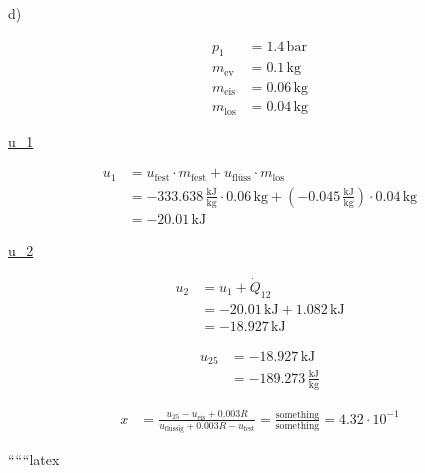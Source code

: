 d)

\begin{align*}
p_1 &= 1.4 \, \text{bar} \\
m_{\text{ev}} &= 0.1 \, \text{kg} \\
m_{\text{eis}} &= 0.06 \, \text{kg} \\
m_{\text{los}} &= 0.04 \, \text{kg}
\end{align*}

\underline{u_1}

\begin{align*}
u_1 &= u_{\text{fest}} \cdot m_{\text{fest}} + u_{\text{flüss}} \cdot m_{\text{los}} \\
&= -333.638 \, \frac{\text{kJ}}{\text{kg}} \cdot 0.06 \, \text{kg} + (-0.045 \, \frac{\text{kJ}}{\text{kg}}) \cdot 0.04 \, \text{kg} \\
&= -20.01 \, \text{kJ}
\end{align*}

\underline{u_2}

\begin{align*}
u_2 &= u_1 + \dot{Q}_{12} \\
&= -20.01 \, \text{kJ} + 1.082 \, \text{kJ} \\
&= -18.927 \, \text{kJ}
\end{align*}

\begin{align*}
u_{25} &= -18.927 \, \text{kJ} \\
&= -189.273 \, \frac{\text{kJ}}{\text{kg}}
\end{align*}

\begin{align*}
x &= \frac{u_{25} - u_{\text{eis}} + 0.003R}{u_{\text{flüssig}} + 0.003R - u_{\text{fest}}} = \frac{\text{something}}{\text{something}} = 4.32 \cdot 10^{-1}
\end{align*}

``````latex